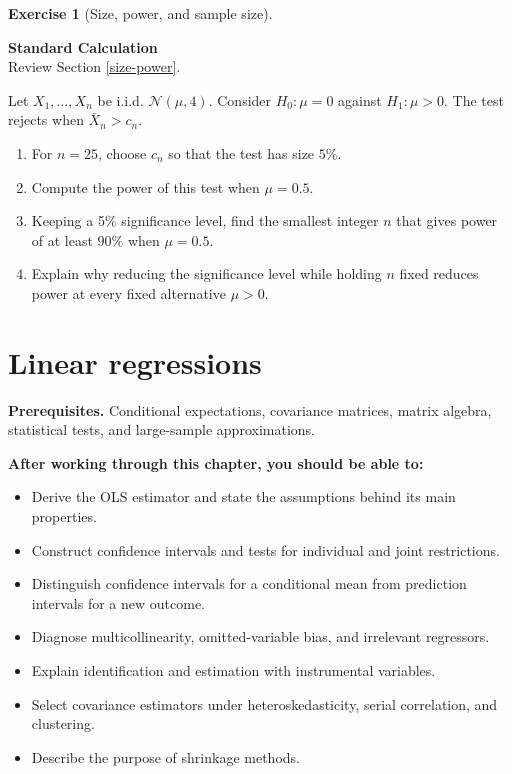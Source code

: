 \documentclass[
  11pt,
]{book}
\providecommand{\tightlist}{%
  \setlength{\itemsep}{0pt}\setlength{\parskip}{0pt}}
\theoremstyle{definition}
\theoremstyle{definition}
\theoremstyle{definition}
\newtheorem{exercise}{Exercise}[chapter]
\theoremstyle{definition}
\theoremstyle{remark}
\begin{document}
\begin{exercisebox}

\begin{exercise}[Size, power, and sample size]
\protect\hypertarget{exr:tests-power-normal-mean}{}\label{exr:tests-power-normal-mean}

\textbf{Standard \textbar{} Calculation}\\
Review Section \ref{size-power}.

Let \(X_1,\dots,X_n\) be i.i.d. \(\mathcal{N}(\mu,4)\). Consider \(H_0:\mu=0\) against \(H_1:\mu>0\). The test rejects when \(\bar X_n>c_n\).

\begin{enumerate}
\def\labelenumi{\arabic{enumi}.}
\tightlist
\item
  For \(n=25\), choose \(c_n\) so that the test has size \(5\%\).
\item
  Compute the power of this test when \(\mu=0.5\).
\item
  Keeping a 5\% significance level, find the smallest integer \(n\) that gives power of at least \(90\%\) when \(\mu=0.5\).
\item
  Explain why reducing the significance level while holding \(n\) fixed reduces power at every fixed alternative \(\mu>0\).
\end{enumerate}

\end{exercise}

\end{exercisebox}

\chapter{Linear regressions}\label{ChapterLS}

\textbf{Prerequisites.} Conditional expectations, covariance matrices, matrix algebra, statistical tests, and large-sample approximations.

\textbf{After working through this chapter, you should be able to:}

\begin{itemize}
\tightlist
\item
  Derive the OLS estimator and state the assumptions behind its main properties.
\item
  Construct confidence intervals and tests for individual and joint restrictions.
\item
  Distinguish confidence intervals for a conditional mean from prediction intervals for a new outcome.
\item
  Diagnose multicollinearity, omitted-variable bias, and irrelevant regressors.
\item
  Explain identification and estimation with instrumental variables.
\item
  Select covariance estimators under heteroskedasticity, serial correlation, and clustering.
\item
  Describe the purpose of shrinkage methods.
\end{itemize}
\end{document}
